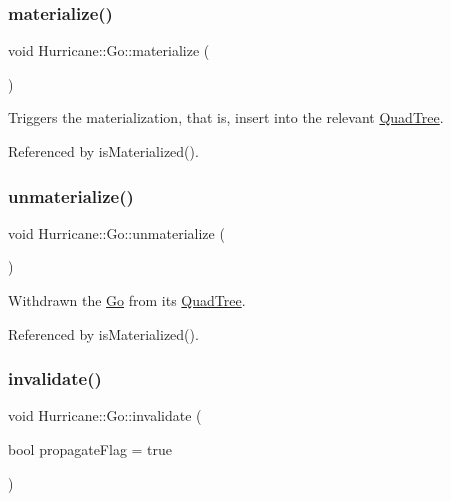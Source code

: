 \subsubsection{\texorpdfstring{materialize()}{materialize()}}
{\footnotesize\ttfamily void Hurricane\+::\+Go\+::materialize (\begin{DoxyParamCaption}{ }\end{DoxyParamCaption})\hspace{0.3cm}{\ttfamily [pure virtual]}}

Triggers the materialization, that is, insert into the relevant \hyperlink{classHurricane_1_1QuadTree}{Quad\+Tree}. 

Referenced by is\+Materialized().

\mbox{\label{classHurricane_1_1Go_af79318dc9cbbed85aea1bb8f16eb9724}} 
\subsubsection{\texorpdfstring{unmaterialize()}{unmaterialize()}}
{\footnotesize\ttfamily void Hurricane\+::\+Go\+::unmaterialize (\begin{DoxyParamCaption}{ }\end{DoxyParamCaption})\hspace{0.3cm}{\ttfamily [pure virtual]}}

Withdrawn the \hyperlink{classHurricane_1_1Go}{Go} from it\textquotesingle{}s \hyperlink{classHurricane_1_1QuadTree}{Quad\+Tree}. 

Referenced by is\+Materialized().

\mbox{\label{classHurricane_1_1Go_a5ee451e118fe8cace16989c0f3a6d855}} 
\subsubsection{\texorpdfstring{invalidate()}{invalidate()}}
{\footnotesize\ttfamily void Hurricane\+::\+Go\+::invalidate (\begin{DoxyParamCaption}\item[{bool}]{propagate\+Flag = {\ttfamily true} }\end{DoxyParamCaption})\hspace{0.3cm}{\ttfamily [virtual]}}

